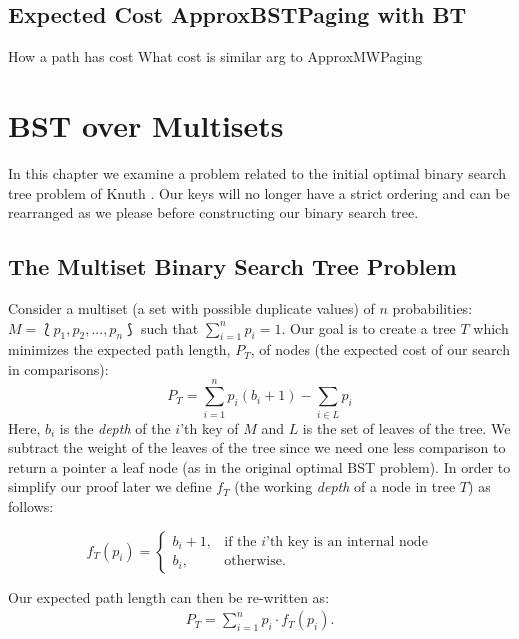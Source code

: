 \documentclass[letterpaper,12pt,titlepage,oneside,final]{book}
\theoremstyle{plain}
\begin{document}
\section{Expected Cost ApproxBSTPaging with BT}
How a path has cost
What cost is
similar arg to ApproxMWPaging

\fi

\chapter{BST over Multisets}\label{BST over Multisets}

In this chapter we examine a problem related to the initial optimal binary search tree problem of Knuth \cite{knuth1971optimum}. Our keys will no longer have a strict ordering and can be rearranged as we please before constructing our binary search tree.

\section{The Multiset Binary Search Tree Problem}\label{The Multiset Binary Search Tree Problem}

 Consider a multiset (a set with possible duplicate values) of $n$ probabilities: $M = \lbag p_1, p_2, ..., p_n \rbag$ such that $\sum\limits_{i=1}^n p_i = 1$. Our goal is to create a tree $T$ which minimizes the expected path length, $P_T$, of nodes (the expected cost of our search in comparisons):
\begin{equation}
P_T = \sum_{i=1}^{n} p_i(b_i+1) - \sum_{i \in L}p_i
\end{equation}
Here, $b_i$ is the \emph{depth} of the $i$'th key of $M$ and $L$ is the set of leaves of the tree. We subtract the weight of the leaves of the tree since we need one less comparison to return a pointer a leaf node (as in the original optimal BST problem). In order to simplify our proof later we define $f_T$ (the working \emph{depth} of a node in tree $T$) as follows:
\begin{center}
\[
    f_T(p_i)= 
\begin{cases}
    b_i+1,& \text{if the } i \text{'th key is an internal node}\\
    b_i,              & \text{otherwise}.
\end{cases}
\]
\end{center}
Our expected path length can then be re-written as:
\begin{align*}
P_T = \sum_{i=1}^{n} p_i\cdot f_T(p_i).
\end{align*}
\end{document}

